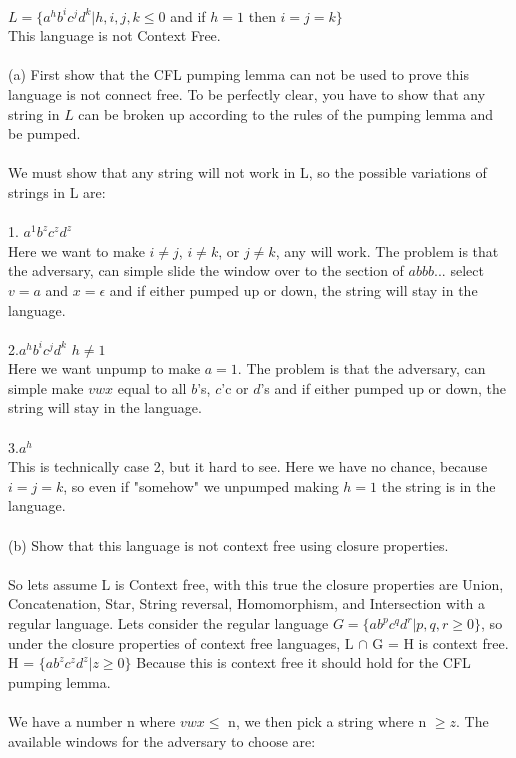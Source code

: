 \documentclass[11pt, oneside]{article}   	%
\begin{document}
\\$L = \{a^hb^ic^jd^k | h,i,j,k \leq 0$ and if $h=1$ then $i=j=k$$\}$
\\
This language is not Context Free.
\\
\\(a) First show that the CFL pumping lemma can not be used to prove this language is not connect free. To be perfectly clear, you have to show that any string in $L$ can be broken up according to the rules of the pumping lemma and be pumped.
\\
\\We must show that any string will not work in L, so the possible variations of strings in L are:
\\
\\1. $a^1b^zc^zd^z$
\\Here we want to make $i \neq j$, $i \neq k$, or $j \neq k$, any will work. The problem is that the adversary, can simple slide the window over to the section of $abbb...$ select $v=a$ and $x=\epsilon$ and if either pumped up or down, the string will stay in the language.
\\
\\2.$a^hb^ic^jd^k$ $h \neq 1$
\\Here we want unpump to make $a = 1$. The problem is that the adversary, can simple make $vwx$ equal to all $b$'s, $c$'c or $d$'s and if either pumped up or down, the string will stay in the language. 
\\
\\3.$a^h$
\\This is technically case 2, but it hard to see. Here we have no chance, because $i=j=k$, so even if "somehow" we unpumped making $h=1$ the string is in the language.
\\
\\(b) Show that this language is not context free using closure properties.
\\
\\So lets assume L is Context free, with this true the closure properties are Union, Concatenation, Star, String reversal, Homomorphism, and Intersection with a regular language. Lets consider the regular language $G = \{ab^pc^qd^r | p,q,r \geq 0 \}$, so under the closure properties of context free languages, L $\cap$ G = H is context free. H = $\{ab^zc^zd^z | z \geq 0\}$ Because this is context free it should hold for the CFL pumping lemma.
\\
\\We have a number n where $vwx \leq$ n, we then pick a string where n $\geq z$. The available windows for the adversary to choose are:
$$
\end{document}
